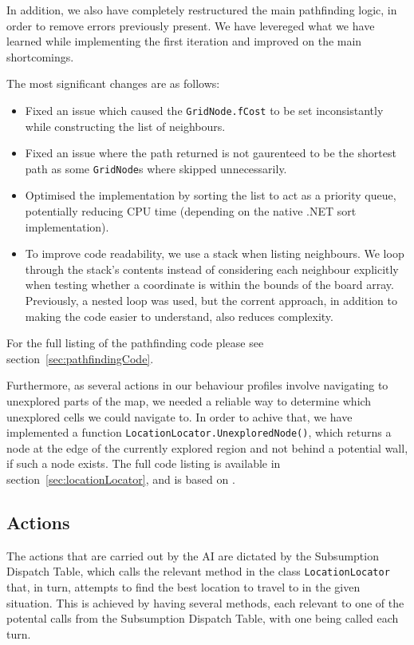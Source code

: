 \documentclass[11pt]{article}
\begin{document}
In addition, we also have completely restructured the main pathfinding logic, in order to remove errors previously present. We have levereged what we have learned while implementing the first iteration\cite{theGloriousWe} and improved on the main shortcomings.

The most significant changes are as follows:

\begin{itemize}
\item Fixed an issue which caused the \verb|GridNode.fCost| to be set inconsistantly while constructing the list of neighbours.
\item Fixed an issue where the path returned is not gaurenteed to be the shortest path as some \verb|GridNode|s where skipped unnecessarily.
\item Optimised the implementation by sorting the list to act as a priority queue, potentially reducing CPU time (depending on the native .NET sort implementation).
\item To improve code readability, we use a stack when listing neighbours. We loop through the stack's contents instead of considering each neighbour explicitly when testing whether a coordinate is within the bounds of the board array. Previously, a nested loop was used, but the corrent approach, in addition to making the code easier to understand, also reduces complexity.
\end{itemize}

For the full listing of the pathfinding code please see section~\ref{sec:pathfindingCode}.

Furthermore, as several actions in our behaviour profiles involve navigating to unexplored parts of the map, we needed a reliable way to determine which unexplored cells we could navigate to. In order to achive that, we have implemented a function \verb|LocationLocator.UnexploredNode()|, which returns a node at the edge of the currently explored region and not behind a potential wall, if such a node exists. The full code listing is available in section~\ref{sec:locationLocator}, and is based on \cite{denport}.

\subsection{Actions} \label{sec:actions}

The actions that are carried out by the AI are dictated by the Subsumption Dispatch Table, which calls the relevant method in the class \verb|LocationLocator| that, in turn, attempts to find the best location to travel to in the given situation. This is achieved by having several methods, each relevant to one of the potental calls from the Subsumption Dispatch Table, with one being called each turn.
\end{document}
